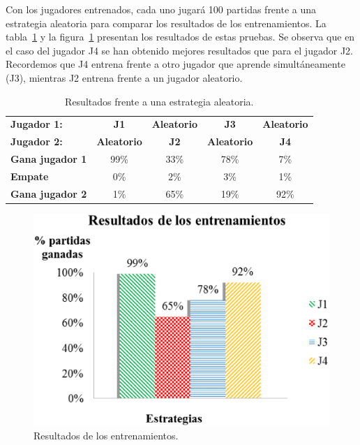 Con los jugadores entrenados, cada uno jugará 100 partidas frente a una estrategia aleatoria para comparar los resultados de los entrenamientos.
La tabla~\ref{tab:comparativa_resultados_entrenamientos} y la figura~\ref{fig:comparativa_resultados_entrenamientos} presentan los resultados de estas pruebas.
Se observa que en el caso del jugador J4 se han obtenido mejores resultados que para el jugador J2.
Recordemos que J4 entrena frente a otro jugador que aprende simultáneamente (J3), mientras J2 entrena frente a un jugador aleatorio.

\begin{table}[t]
\centering
\caption{Resultados frente a una estrategia aleatoria.}
\label{tab:comparativa_resultados_entrenamientos}
\begin{tabular}{lcccc}
\hline
\textbf{Jugador 1:} & \textbf{J1} & \textbf{Aleatorio} & \textbf{J3} & \textbf{Aleatorio} \\
\textbf{Jugador 2:} & \textbf{Aleatorio} & \textbf{J2} & \textbf{Aleatorio} & \textbf{J4} \\
\textbf{Gana jugador 1} & 99\% & 33\% & 78\% & 7\% \\
\textbf{Empate} & 0\% & 2\% & 3\% & 1\% \\
\textbf{Gana jugador 2}  & 1\% & 65\% & 19\% & 92\% \\
\hline
\end{tabular}
\end{table} 

\begin{figure}[t]
	\centering
	\includegraphics[scale=0.3]{contenido/cap7/imagenes/entrenamientosResultados.eps}
	\caption{Resultados de los entrenamientos.}
	\label{fig:comparativa_resultados_entrenamientos}
\end{figure} 

